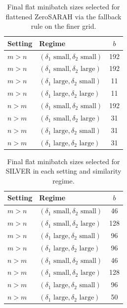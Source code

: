 \documentclass{article}
\theoremstyle{plain}
\newcommand{\algname}[1]{{\sf\scalefont{0.88}\color{mydarkgreen}#1}\xspace}
\def\algname#1{#1}%
\begin{document}
\begin{table}[t]
\centering
\small
\setlength{\tabcolsep}{5pt}
\caption{Final flat minibatch sizes selected for flattened \algname{ZeroSARAH} via the fallback rule on the finer grid.}
\begin{tabular}{llc}
\toprule
\textbf{Setting} & \textbf{Regime} & $b$ \\
\midrule
$m>n$ & $(\delta_1 \text{ small}, \delta_2 \text{ small})$ & 192 \\
$m>n$ & $(\delta_1 \text{ small}, \delta_2 \text{ large})$ & 192 \\
$m>n$ & $(\delta_1 \text{ large}, \delta_2 \text{ small})$ & 11 \\
$m>n$ & $(\delta_1 \text{ large}, \delta_2 \text{ large})$ & 11 \\
\midrule
$n>m$ & $(\delta_1 \text{ small}, \delta_2 \text{ small})$ & 192 \\
$n>m$ & $(\delta_1 \text{ small}, \delta_2 \text{ large})$ & 31 \\
$n>m$ & $(\delta_1 \text{ large}, \delta_2 \text{ small})$ & 31 \\
$n>m$ & $(\delta_1 \text{ large}, \delta_2 \text{ large})$ & 31 \\
\bottomrule
\end{tabular}
\end{table}

\begin{table}[t]
\centering
\small
\setlength{\tabcolsep}{5pt}
\caption{Final flat minibatch sizes selected for \algname{SILVER} in each setting and similarity regime.}
\begin{tabular}{llc}
\toprule
\textbf{Setting} & \textbf{Regime} & $b$ \\
\midrule
$m>n$ & $(\delta_1 \text{ small}, \delta_2 \text{ small})$ & 46 \\
$m>n$ & $(\delta_1 \text{ small}, \delta_2 \text{ large})$ & 128 \\
$m>n$ & $(\delta_1 \text{ large}, \delta_2 \text{ small})$ & 96 \\
$m>n$ & $(\delta_1 \text{ large}, \delta_2 \text{ large})$ & 96 \\
\midrule
$n>m$ & $(\delta_1 \text{ small}, \delta_2 \text{ small})$ & 46 \\
$n>m$ & $(\delta_1 \text{ small}, \delta_2 \text{ large})$ & 128 \\
$n>m$ & $(\delta_1 \text{ large}, \delta_2 \text{ small})$ & 96 \\
$n>m$ & $(\delta_1 \text{ large}, \delta_2 \text{ large})$ & 50 \\
\bottomrule
\end{tabular}
\end{table}
\end{document}

